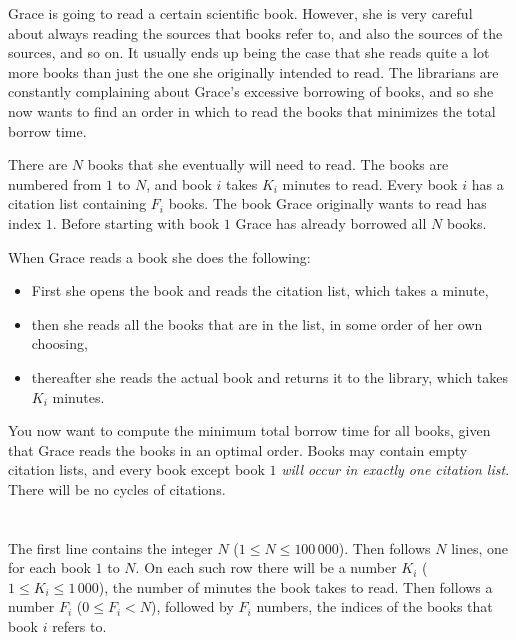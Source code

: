 \ifx\boi\undefined\fi
\def\version{jury-1}

Grace is going to read a certain scientific book.
However, she is very careful about always reading the sources that books refer
to, and also the sources of the sources, and so on.
It usually ends up being the case that she reads quite a lot more books than
just the one she originally intended to read.
The librarians are constantly complaining about Grace's excessive borrowing of
books, and so she now wants to find an order in which to read the books that
minimizes the total borrow time.

There are $N$ books that she eventually will need to read.
The books are numbered from $1$ to $N$, and book $i$ takes $K_i$ minutes to read.
Every book $i$ has a citation list containing $F_i$ books.
The book Grace originally wants to read has index $1$.
Before starting with book $1$ Grace has already borrowed all $N$ books.

When Grace reads a book she does the following:

\begin{itemize}
\item First she opens the book and reads the citation list, which takes a minute,
\item then she reads all the books that are in the list, in some order of her own choosing,
\item thereafter she reads the actual book and returns it to the library, which takes $K_i$ minutes.
\end{itemize}

You now want to compute the minimum total borrow time for all books, given that Grace reads the books in an optimal order.
Books may contain empty citation lists, and every book except book $1$ {\em will occur in exactly one citation list}.
There will be no cycles of citations.

\section*{}
The first line contains the integer $N$ ($1 \le N \le 100\,000$).
Then follows $N$ lines, one for each book $1$ to $N$.
On each such row there will be a number $K_i$ ($1 \le K_i \le 1\,000$), the number of minutes the book takes to read.
Then follows a number $F_i$ ($0 \le F_i < N$), followed by $F_i$ numbers, the indices of the books that book $i$ refers to.

